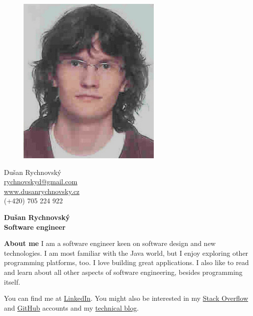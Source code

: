 \documentclass[a4paper,11pt,final]{memoir}
\newcommand{\Sep}{\vspace{1.4em}}
\newenvironment{AboutMe}
	{\ignorespaces\textbf{\color{RoyalBlue} About me}}
	{\Sep\ignorespacesafterend}
\begin{document}
\begin{figure}
	\hfill
	\includegraphics[width=0.6\columnwidth]{photo.jpg}
	\vspace{-7cm}
\end{figure}

\begin{flushright}\small
	Dušan Rychnovský \\
	\url{rychnovskyd@gmail.com}  \\
	\url{www.dusanrychnovsky.cz} \\
	(+420) 705 224 922
\end{flushright}\normalsize
\framebreak


\Huge\bfseries {\color{RoyalBlue} Dušan Rychnovský} \\
\Large\bfseries  Software engineer \\

\normalsize\normalfont

\begin{AboutMe}
I am a software engineer keen on software design and new technologies. I am most familiar with the Java world, but I enjoy exploring other programming platforms, too. I love building great applications. I also like to read and learn about all other aspects of software engineering, besides programming itself.

\medskip
You can find me at 
\href{http://cz.linkedin.com/pub/du%C5%A1an-rychnovsk%C3%BD/96/a42/a0/}{LinkedIn}.
You might also be interested in my
\href{http://stackoverflow.com/users/1103412/dusan-rychnovsky}{Stack Overflow} and
\href{https://github.com/dusan-rychnovsky}{GitHub} accounts and my
\href{http://blog.dusanrychnovsky.cz}{technical blog}.
\end{AboutMe}
\end{document}
